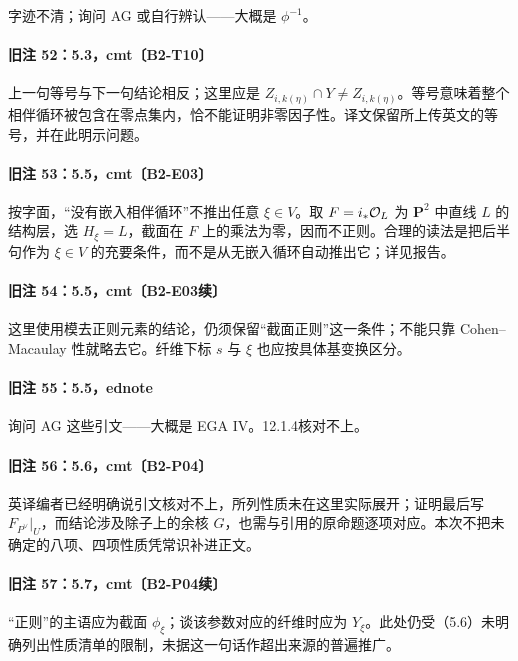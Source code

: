 字迹不清；询问 AG 或自行辨认——大概是 $\phi^{-1}$。

\paragraph{旧注 52：5.3，cmt〔B2-T10〕}

上一句等号与下一句结论相反；这里应是 $Z_{i,k(\eta)}\cap Y\ne Z_{i,k(\eta)}$。等号意味着整个相伴循环被包含在零点集内，恰不能证明非零因子性。译文保留所上传英文的等号，并在此明示问题。

\paragraph{旧注 53：5.5，cmt〔B2-E03〕}

按字面，“没有嵌入相伴循环”不推出任意 $\xi\in V$。取 $F=i_*\mathcal O_L$ 为 $\mathbf P^2$ 中直线 $L$ 的结构层，选 $H_\xi=L$，截面在 $F$ 上的乘法为零，因而不正则。合理的读法是把后半句作为 $\xi\in V$ 的充要条件，而不是从无嵌入循环自动推出它；详见报告。

\paragraph{旧注 54：5.5，cmt〔B2-E03续〕}

这里使用模去正则元素的结论，仍须保留“截面正则”这一条件；不能只靠 Cohen--Macaulay 性就略去它。纤维下标 $s$ 与 $\xi$ 也应按具体基变换区分。

\paragraph{旧注 55：5.5，ednote}

询问 AG 这些引文——大概是 EGA IV。12.1.4核对不上。

\paragraph{旧注 56：5.6，cmt〔B2-P04〕}

英译编者已经明确说引文核对不上，所列性质未在这里实际展开；证明最后写 $F_{P^\vee}|_U$，而结论涉及除子上的余核 $G$，也需与引用的原命题逐项对应。本次不把未确定的八项、四项性质凭常识补进正文。

\paragraph{旧注 57：5.7，cmt〔B2-P04续〕}

“正则”的主语应为截面 $\phi_\xi$；谈该参数对应的纤维时应为 $Y_\xi$。此处仍受（5.6）未明确列出性质清单的限制，未据这一句话作超出来源的普遍推广。

